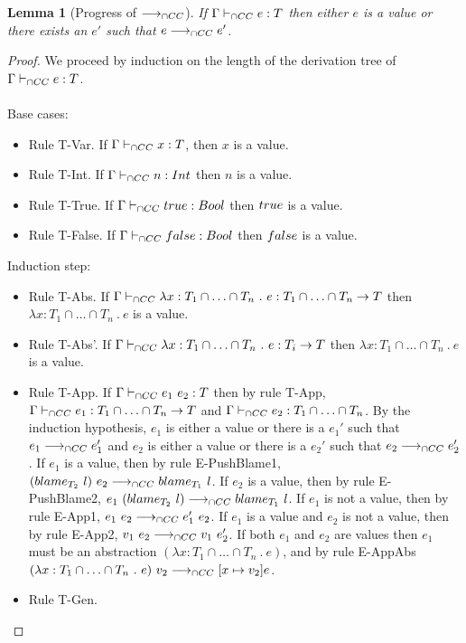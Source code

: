 \documentclass[a4paper]{article}
\newtheorem{lemma}{Lemma}[section]
\begin{document}
\begin{lemma}[Progress of $\longrightarrow_{\cap CC}$]
\label{progress}
If $\Gamma \vdash_{\cap CC} e : T$ then either $e$ is a value or there exists an $e'$ such that $e \longrightarrow_{\cap CC} e'$.
\end{lemma}
\begin{proof}
We proceed by induction on the length of the derivation tree of $\Gamma \vdash_{\cap CC} e : T$.\\\\
Base cases:
\begin{itemize}
    \item Rule T-Var.
    If $\Gamma \vdash_{\cap CC} x : T$, then $x$ is a value.
    \item Rule T-Int.
    If  $\Gamma \vdash_{\cap CC} n : {Int}$ then $n$ is a value.
    \item Rule T-True.
    If $\Gamma \vdash_{\cap CC} true : Bool$ then $true$ is a value.
    \item Rule T-False.
    If $\Gamma \vdash_{\cap CC} false : Bool$ then $false$ is a value.
\end{itemize}
Induction step:
\begin{itemize}
    \item Rule T-Abs.
    If $\Gamma \vdash_{\cap CC} \lambda x : T_1 \cap \ldots \cap T_n\ .\ e : T_1 \cap \ldots \cap T_n \rightarrow T$ then $\lambda x : T_1 \cap \ldots \cap T_n\ .\ e$ is a value.
    \item Rule T-Abs'.
    If $\Gamma \vdash_{\cap CC} \lambda x : T_1 \cap \ldots \cap T_n\ .\ e : T_i \rightarrow T$ then $\lambda x : T_1 \cap \ldots \cap T_n\ .\ e$ is a value.
    \item Rule T-App.
    If $\Gamma \vdash_{\cap CC} e_1\ e_2 : T$ then by rule T-App, $\Gamma \vdash_{\cap CC} e_1 : T_1 \cap \ldots \cap T_n \rightarrow T$ and $\Gamma \vdash_{\cap CC} e_2 : T_1 \cap \ldots \cap T_n$.
    By the induction hypothesis, $e_1$ is either a value or there is a $e_1'$ such that $e_1 \longrightarrow_{\cap CC} e_1'$ and $e_2$ is either a value or there is a $e_2'$ such that $e_2 \longrightarrow_{\cap CC} e_2'$.
    If $e_1$ is a value, then by rule E-PushBlame1, $(blame_{T_2}\ l)\ e_2 \longrightarrow_{\cap CC} blame_{T_1}\ l$.
    If $e_2$ is a value, then by rule E-PushBlame2, $e_1\ (\blame{T_2}{l}) \gios \blame{T_1}{l}$.
    If $e_1$ is not a value, then by rule E-App1, $e_1\ e_2 \longrightarrow_{\cap CC} e_1'\ e_2$.
    If $e_1$ is a value and $e_2$ is not a value, then by rule E-App2, $v_1\ e_2 \longrightarrow_{\cap CC} v_1\ e_2'$.
    If both $e_1$ and $e_2$ are values then $e_1$ must be an abstraction $(\lambda x : T_1 \cap \ldots \cap T_n\ .\ e)$, and by rule E-AppAbs $(\lambda x : T_1 \cap \ldots \cap T_n\ .\ e)\ v_2 \longrightarrow_{\cap CC} [x \mapsto v_2]e$.
    \item Rule T-Gen.

\end{itemize}
\end{proof}
\end{document}
